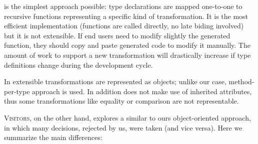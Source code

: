  is the simplest approach possible: type declarations are mapped one-to-one to recursive functions representing a specific kind of
transformation. It is the most efficient implementation (functions are called directly, no late biding involved) but it is not extensible. If end users
need to modify slightly the generated function, they should copy and paste generated code to modify it manually. The amount of work to support a new
transformation will drastically increase if type definitions change during the development cycle.

In  extensible transformations are represented as objects; unlike our case, method-per-type approach is used. In addition 
 does not make use of inherited attributes, thus some transformations like equality or comparison are not representable.

\textsc{Visitors}, on the other hand, explores a similar to ours object-oriented approach, in which many decisions, rejected by us, were taken (and vice versa). Here
we summarize the main differences:

